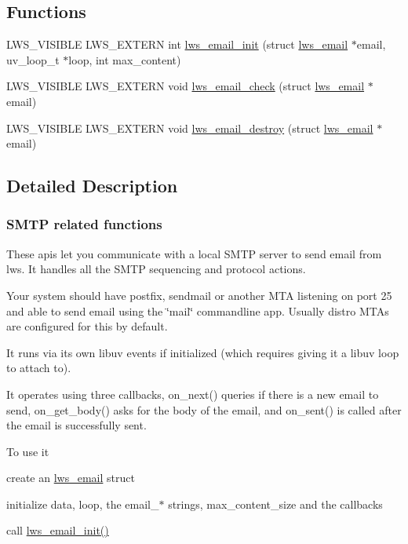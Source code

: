 \subsection*{Functions}
\begin{DoxyCompactItemize}
\item 
L\+W\+S\+\_\+\+V\+I\+S\+I\+B\+LE L\+W\+S\+\_\+\+E\+X\+T\+E\+RN int \hyperlink{group__smtp_ga77fc9b56a1bb39484844981ec375fc29}{lws\+\_\+email\+\_\+init} (struct \hyperlink{structlws__email}{lws\+\_\+email} $\ast$email, uv\+\_\+loop\+\_\+t $\ast$loop, int max\+\_\+content)
\item 
L\+W\+S\+\_\+\+V\+I\+S\+I\+B\+LE L\+W\+S\+\_\+\+E\+X\+T\+E\+RN void \hyperlink{group__smtp_ga5e535e346d92a9daf00be33abf79d4eb}{lws\+\_\+email\+\_\+check} (struct \hyperlink{structlws__email}{lws\+\_\+email} $\ast$email)
\item 
L\+W\+S\+\_\+\+V\+I\+S\+I\+B\+LE L\+W\+S\+\_\+\+E\+X\+T\+E\+RN void \hyperlink{group__smtp_ga25298a5afc1074e13b2d5711a86432b2}{lws\+\_\+email\+\_\+destroy} (struct \hyperlink{structlws__email}{lws\+\_\+email} $\ast$email)
\end{DoxyCompactItemize}


\subsection{Detailed Description}
\subsubsection*{S\+M\+TP related functions}

These apis let you communicate with a local S\+M\+TP server to send email from lws. It handles all the S\+M\+TP sequencing and protocol actions.

Your system should have postfix, sendmail or another M\+TA listening on port 25 and able to send email using the \char`\"{}mail\char`\"{} commandline app. Usually distro M\+T\+As are configured for this by default.

It runs via its own libuv events if initialized (which requires giving it a libuv loop to attach to).

It operates using three callbacks, on\+\_\+next() queries if there is a new email to send, on\+\_\+get\+\_\+body() asks for the body of the email, and on\+\_\+sent() is called after the email is successfully sent.

To use it


\begin{DoxyItemize}
\item create an \hyperlink{structlws__email}{lws\+\_\+email} struct
\item initialize data, loop, the email\+\_\+$\ast$ strings, max\+\_\+content\+\_\+size and the callbacks
\item call \hyperlink{group__smtp_ga77fc9b56a1bb39484844981ec375fc29}{lws\+\_\+email\+\_\+init()}
\end{DoxyItemize}

